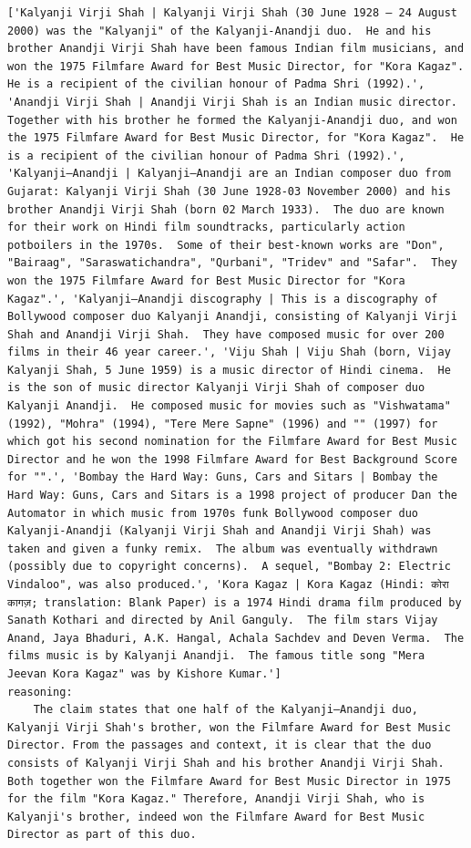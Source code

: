 \begin{instructbox}
\begin{lstlisting}[breakindent=0pt, breaklines=true, breakatwhitespace=true, frame=single, backgroundcolor=\color{green!10}]
    ['Kalyanji Virji Shah | Kalyanji Virji Shah (30 June 1928 – 24 August 2000) was the "Kalyanji" of the Kalyanji-Anandji duo.  He and his brother Anandji Virji Shah have been famous Indian film musicians, and won the 1975 Filmfare Award for Best Music Director, for "Kora Kagaz".  He is a recipient of the civilian honour of Padma Shri (1992).', 'Anandji Virji Shah | Anandji Virji Shah is an Indian music director.  Together with his brother he formed the Kalyanji-Anandji duo, and won the 1975 Filmfare Award for Best Music Director, for "Kora Kagaz".  He is a recipient of the civilian honour of Padma Shri (1992).', 'Kalyanji–Anandji | Kalyanji–Anandji are an Indian composer duo from Gujarat: Kalyanji Virji Shah (30 June 1928-03 November 2000) and his brother Anandji Virji Shah (born 02 March 1933).  The duo are known for their work on Hindi film soundtracks, particularly action potboilers in the 1970s.  Some of their best-known works are "Don", "Bairaag", "Saraswatichandra", "Qurbani", "Tridev" and "Safar".  They won the 1975 Filmfare Award for Best Music Director for "Kora Kagaz".', 'Kalyanji–Anandji discography | This is a discography of Bollywood composer duo Kalyanji Anandji, consisting of Kalyanji Virji Shah and Anandji Virji Shah.  They have composed music for over 200 films in their 46 year career.', 'Viju Shah | Viju Shah (born, Vijay Kalyanji Shah, 5 June 1959) is a music director of Hindi cinema.  He is the son of music director Kalyanji Virji Shah of composer duo Kalyanji Anandji.  He composed music for movies such as "Vishwatama" (1992), "Mohra" (1994), "Tere Mere Sapne" (1996) and "" (1997) for which got his second nomination for the Filmfare Award for Best Music Director and he won the 1998 Filmfare Award for Best Background Score for "".', 'Bombay the Hard Way: Guns, Cars and Sitars | Bombay the Hard Way: Guns, Cars and Sitars is a 1998 project of producer Dan the Automator in which music from 1970s funk Bollywood composer duo Kalyanji-Anandji (Kalyanji Virji Shah and Anandji Virji Shah) was taken and given a funky remix.  The album was eventually withdrawn (possibly due to copyright concerns).  A sequel, "Bombay 2: Electric Vindaloo", was also produced.', 'Kora Kagaz | Kora Kagaz (Hindi: कोरा कागज़; translation: Blank Paper) is a 1974 Hindi drama film produced by Sanath Kothari and directed by Anil Ganguly.  The film stars Vijay Anand, Jaya Bhaduri, A.K. Hangal, Achala Sachdev and Deven Verma.  The films music is by Kalyanji Anandji.  The famous title song "Mera Jeevan Kora Kagaz" was by Kishore Kumar.']
reasoning:
    The claim states that one half of the Kalyanji–Anandji duo, Kalyanji Virji Shah's brother, won the Filmfare Award for Best Music Director. From the passages and context, it is clear that the duo consists of Kalyanji Virji Shah and his brother Anandji Virji Shah. Both together won the Filmfare Award for Best Music Director in 1975 for the film "Kora Kagaz." Therefore, Anandji Virji Shah, who is Kalyanji's brother, indeed won the Filmfare Award for Best Music Director as part of this duo.

\end{lstlisting}
\end{instructbox}
